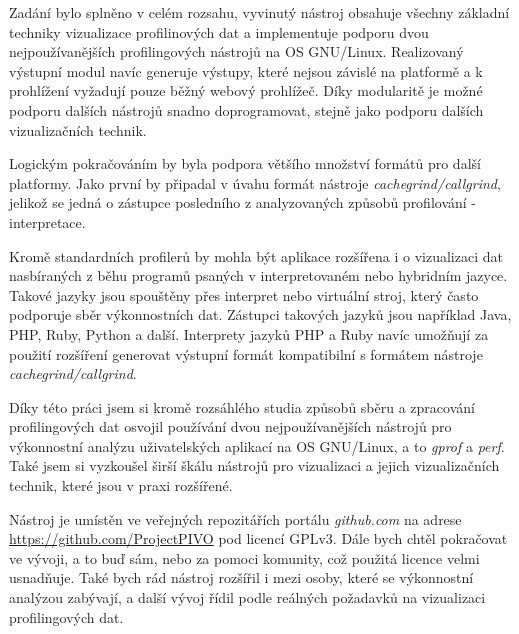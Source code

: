 \documentclass[czech,BP]{thesiskiv}
\begin{document}
Zadání bylo splněno v celém rozsahu, vyvinutý nástroj obsahuje všechny základní techniky vizualizace profilinových dat a implementuje podporu dvou nejpoužívanějších profilingových nástrojů na OS GNU/Linux. Realizovaný výstupní modul navíc generuje výstupy, které nejsou závislé na platformě a k prohlížení vyžadují pouze běžný webový prohlížeč. Díky modularitě je možné podporu dalších nástrojů snadno doprogramovat, stejně jako podporu dalších vizualizačních technik.

Logickým pokračováním by byla podpora většího množství formátů pro další platformy. Jako první by připadal v úvahu formát nástroje \emph{cachegrind/callgrind}, jelikož se jedná o zástupce posledního z analyzovaných způsobů profilování - interpretace.

Kromě standardních profilerů by mohla být aplikace rozšířena i o vizualizaci dat nasbíraných z běhu programů psaných v interpretovaném nebo hybridním jazyce. Takové jazyky jsou spouštěny přes interpret nebo virtuální stroj, který často podporuje sběr výkonnostních dat. Zástupci takových jazyků jsou například Java, PHP, Ruby, Python a další. Interprety jazyků PHP a Ruby navíc umožňují za použití rozšíření generovat výstupní formát kompatibilní s formátem nástroje \emph{cachegrind/callgrind}\cite{xdebugcache,rubycache}.

Díky této práci jsem si kromě rozsáhlého studia způsobů sběru a zpracování profilingových dat osvojil používání dvou nejpoužívanějších nástrojů pro výkonnostní analýzu uživatelských aplikací na OS GNU/Linux, a to \emph{gprof} a \emph{perf}. Také jsem si vyzkoušel širší škálu nástrojů pro vizualizaci a jejich vizualizačních technik, které jsou v praxi rozšířené. 

Nástroj je umístěn ve veřejných repozitářích portálu \emph{github.com} na adrese \url{https://github.com/ProjectPIVO} pod licencí GPLv3\cite{gplv3}. Dále bych chtěl pokračovat ve vývoji, a to buď sám, nebo za pomoci komunity, což použitá licence velmi usnadňuje. Také bych rád nástroj rozšířil i mezi osoby, které se výkonnostní analýzou zabývají, a další vývoj řídil podle reálných požadavků na vizualizaci profilingových dat.




\newpage


{\raggedright\small

}






\end{document}
